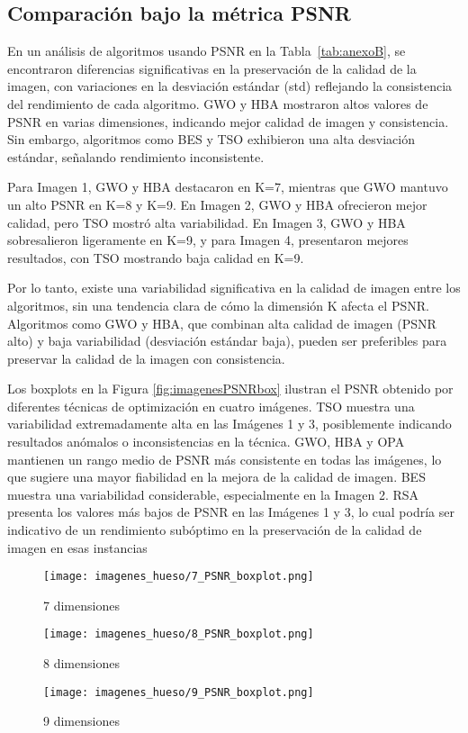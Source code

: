 \documentclass[conference]{IEEEtran}
\begin{document}
\subsection{Comparación bajo la métrica PSNR}
\noindent En un análisis de algoritmos usando PSNR en la Tabla~\ref{tab:anexoB}, se encontraron diferencias significativas en la preservación de la calidad de la imagen, con variaciones en la desviación estándar (std) reflejando la consistencia del rendimiento de cada algoritmo. GWO y HBA mostraron altos valores de PSNR en varias dimensiones, indicando mejor calidad de imagen y consistencia. Sin embargo, algoritmos como BES y TSO exhibieron una alta desviación estándar, señalando rendimiento inconsistente.

\noindent Para Imagen 1, GWO y HBA destacaron en K=7, mientras que GWO mantuvo un alto PSNR en K=8 y K=9. En Imagen 2, GWO y HBA ofrecieron mejor calidad, pero TSO mostró alta variabilidad. En Imagen 3, GWO y HBA sobresalieron ligeramente en K=9, y para Imagen 4, presentaron mejores resultados, con TSO mostrando baja calidad en K=9.

\noindent Por lo tanto, existe una variabilidad significativa en la calidad de imagen entre los algoritmos, sin una tendencia clara de cómo la dimensión K afecta el PSNR. Algoritmos como GWO y HBA, que combinan alta calidad de imagen (PSNR alto) y baja variabilidad (desviación estándar baja), pueden ser preferibles para preservar la calidad de la imagen con consistencia.

\noindent Los boxplots en la Figura \ref{fig:imagenesPSNRbox} ilustran el PSNR obtenido por diferentes técnicas de optimización en cuatro imágenes. TSO muestra una variabilidad extremadamente alta en las Imágenes 1 y 3, posiblemente indicando resultados anómalos o inconsistencias en la técnica. GWO, HBA y OPA mantienen un rango medio de PSNR más consistente en todas las imágenes, lo que sugiere una mayor fiabilidad en la mejora de la calidad de imagen. BES muestra una variabilidad considerable, especialmente en la Imagen 2. RSA presenta los valores más bajos de PSNR en las Imágenes 1 y 3, lo cual podría ser indicativo de un rendimiento subóptimo en la preservación de la calidad de imagen en esas instancias
\begin{figure*}[!t]
  \centering
  \begin{subfigure}{0.3\textwidth}
    \texttt{[image: imagenes\_hueso/7\_PSNR\_boxplot.png]}
    \caption{7 dimensiones}
    \label{subfig:fig111}
  \end{subfigure}
  \hfil
  \begin{subfigure}{0.3\textwidth}
    \texttt{[image: imagenes\_hueso/8\_PSNR\_boxplot.png]}
    \caption{8 dimensiones}
    \label{subfig:fig211}
  \end{subfigure}
  \hfil
  \begin{subfigure}{0.3\textwidth}
    \texttt{[image: imagenes\_hueso/9\_PSNR\_boxplot.png]}
    \caption{9 dimensiones}
    \label{subfig:fig311}
  \end{subfigure}
  \caption{Boxplot de la métrica PSNR.}
  \label{fig:imagenesPSNRbox}
\end{figure*}
\end{document}
